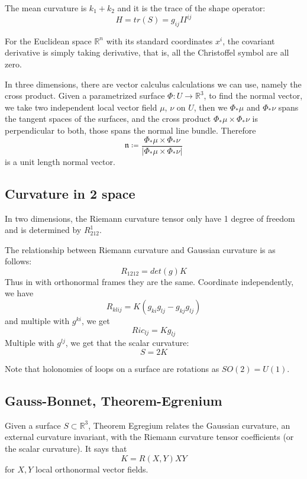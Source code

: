 \documentclass[main.tex]{subfiles}
\begin{document}
The mean curvature is $k_1 + k_2$ and it is the trace of the shape operator:
$$
H = tr(S) = g_{ij} II^{ij}
$$

For the Euclidean space $\mathbb{R}^n$ with its standard coordinates $x^i$, the covariant derivative is simply taking derivative, that is, all the Christoffel symbol are all zero.

In three dimensions, there are vector calculus calculations we can use, namely the cross product. Given a parametrized surface $\Phi: U \rightarrow \mathbb{R}^3$, to find the normal vector, we take two independent local vector field $\mu$, $\nu$ on $U$, then we $\Phi_* {\mu}$ and $\Phi_* \nu$ spans the tangent spaces of the surfaces, and the cross product $\Phi_* \mu \times \Phi_* \nu$ is perpendicular to both, those spans the normal line bundle. Therefore 
$$
\mathfrak{n} \coloneqq \frac{\Phi_* \mu \times \Phi_* \nu}{|\Phi_* \mu \times \Phi_* \nu|}
$$
is a unit length normal vector. 

\subsection{Curvature in 2 space}

In two dimensions, the Riemann curvature tensor only have 1 degree of freedom and is determined by 
$R^1 _{212}$. 

The relationship between Riemann curvature and Gaussian curvature is as follows:
$$
R_{1212} = det(g) K
$$
Thus in with orthonormal frames they are the same. Coordinate independently, we have 
$$
R_{klij} = K (g_{ki}g_{lj} - g_{kj}g_{lj})
$$
and multiple with $g^{ki}$, we get 
$$
Ric_{lj} = K g_{lj}
$$
Multiple with $g^{lj}$, we get that the scalar curvature:
$$
S = 2K
$$

\begin{remark}
Note that holonomies of loops on a surface are rotations as $SO(2) = U(1)$.
\end{remark}
\subsection{Gauss-Bonnet, Theorem-Egrenium}

Given a surface $S \subset \mathbb{R}^3$, Theorem Egregium relates the Gaussian curvature, an external curvature invariant, with the Riemann curvature tensor coefficients (or the scalar curvature). It says that 
$$
K = R(X, Y) X Y
$$
for $X, Y$ local orthonormal vector fields. 
\end{document}
